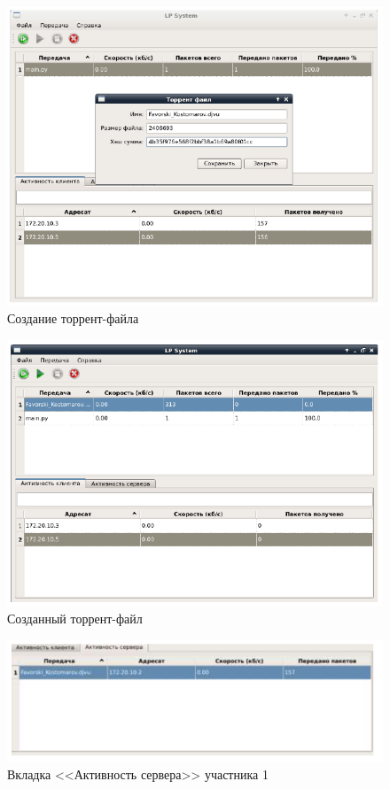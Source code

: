 \begin{figure}[!hbt]
    \centering
    \includegraphics[width=\textwidth]{log_15}
    \caption{Создание торрент-файла}\label{log_15}
\end{figure}
\begin{figure}[!hbt]
    \centering
    \includegraphics[width=\textwidth]{log_16}
    \caption{Созданный торрент-файл}\label{log_16}
\end{figure}
\begin{figure}[!hbt]
    \centering
    \includegraphics[width=\textwidth]{log_18}
    \caption{Вкладка <<Активность сервера>> участника 1}\label{log_18}
\end{figure}
